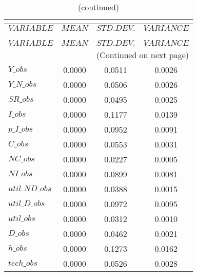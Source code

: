  
\begin{center}
\begin{longtable}{lccc} 
\caption{THEORETICAL MOMENTS}\\
 \label{Table:th_moments}\\
\toprule 
$VARIABLE       $	 & 	 $         MEAN$	 & 	 $    STD. DEV.$	 & 	 $     VARIANCE$\\
\midrule \endfirsthead 
\caption{(continued)}\\
 \toprule \\ 
$VARIABLE       $	 & 	 $         MEAN$	 & 	 $    STD. DEV.$	 & 	 $     VARIANCE$\\
\midrule \endhead 
\midrule \multicolumn{4}{r}{(Continued on next page)} \\ \bottomrule \endfoot 
\bottomrule \endlastfoot 
$Y\_obs         $	 & 	       0.0000	 & 	       0.0511	 & 	       0.0026 \\ 
$Y\_N\_obs      $	 & 	       0.0000	 & 	       0.0506	 & 	       0.0026 \\ 
$SR\_obs        $	 & 	       0.0000	 & 	       0.0495	 & 	       0.0025 \\ 
$I\_obs         $	 & 	       0.0000	 & 	       0.1177	 & 	       0.0139 \\ 
$p\_I\_obs      $	 & 	       0.0000	 & 	       0.0952	 & 	       0.0091 \\ 
$C\_obs         $	 & 	       0.0000	 & 	       0.0553	 & 	       0.0031 \\ 
$NC\_obs        $	 & 	       0.0000	 & 	       0.0227	 & 	       0.0005 \\ 
$NI\_obs        $	 & 	       0.0000	 & 	       0.0899	 & 	       0.0081 \\ 
$util\_ND\_obs  $	 & 	       0.0000	 & 	       0.0388	 & 	       0.0015 \\ 
$util\_D\_obs   $	 & 	       0.0000	 & 	       0.0972	 & 	       0.0095 \\ 
$util\_obs      $	 & 	       0.0000	 & 	       0.0312	 & 	       0.0010 \\ 
$D\_obs         $	 & 	       0.0000	 & 	       0.0462	 & 	       0.0021 \\ 
$h\_obs         $	 & 	       0.0000	 & 	       0.1273	 & 	       0.0162 \\ 
$tech\_obs      $	 & 	       0.0000	 & 	       0.0526	 & 	       0.0028 \\ 
\end{longtable}
 \end{center}
